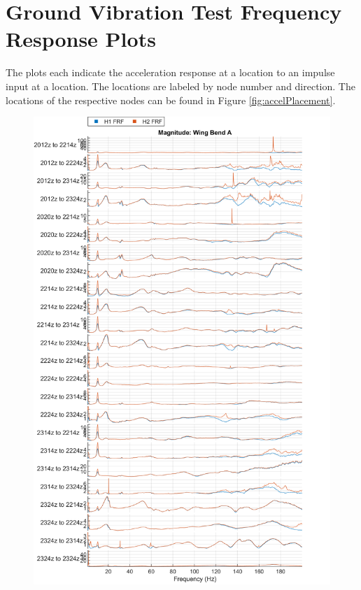 \chapter{Ground Vibration Test Frequency Response Plots}
\label{ap:gvtPlot}

The plots each indicate the acceleration response at a location to an impulse input at a location. The locations are labeled by node number and direction. The locations of the respective nodes can be found in Figure \ref{fig:accelPlacement}.

\begin{figure}[H]
    \centering
    \includegraphics{figs/GVT/mag_Wing Bend A.png}
    \label{fig:mag_wingBendA}
\end{figure}
